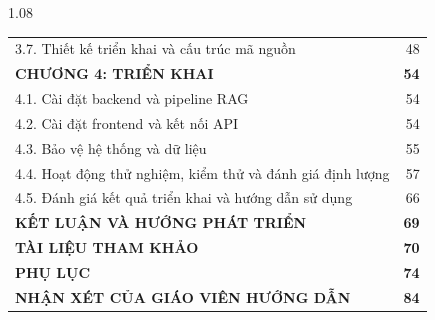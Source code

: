 \begin{spacing}{1.08}
\begin{longtable}{@{}p{}r@{}}
\hspace*{0.35cm} 3.7. Thiết kế triển khai và cấu trúc mã nguồn & 48\\
\textbf{CHƯƠNG 4: TRIỂN KHAI} & \textbf{54}\\
\hspace*{0.35cm} 4.1. Cài đặt backend và pipeline RAG & 54\\
\hspace*{0.35cm} 4.2. Cài đặt frontend và kết nối API & 54\\
\hspace*{0.35cm} 4.3. Bảo vệ hệ thống và dữ liệu & 55\\
\hspace*{0.35cm} 4.4. Hoạt động thử nghiệm, kiểm thử và đánh giá định lượng & 57\\
\hspace*{0.35cm} 4.5. Đánh giá kết quả triển khai và hướng dẫn sử dụng & 66\\
\textbf{KẾT LUẬN VÀ HƯỚNG PHÁT TRIỂN} & \textbf{69}\\
\textbf{TÀI LIỆU THAM KHẢO} & \textbf{70}\\
\textbf{PHỤ LỤC} & \textbf{74}\\
\textbf{NHẬN XÉT CỦA GIÁO VIÊN HƯỚNG DẪN} & \textbf{84}\\
\end{longtable}
\end{spacing}